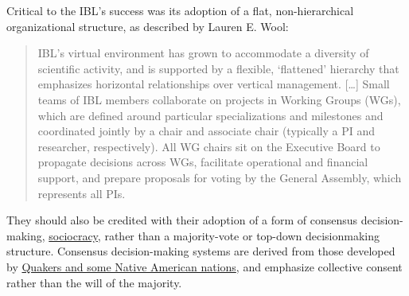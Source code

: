 Critical to the IBL's success was its adoption of a flat,
non-hierarchical organizational structure, as described by Lauren E.
Wool:

\begin{quote}
IBL's virtual environment has grown to accommodate a diversity of
scientific activity, and is supported by a flexible, `flattened'
hierarchy that emphasizes horizontal relationships over vertical
management. {[}\ldots{]} Small teams of IBL members collaborate on
projects in Working Groups (WGs), which are defined around particular
specializations and milestones and coordinated jointly by a chair and
associate chair (typically a PI and researcher, respectively). All WG
chairs sit on the Executive Board to propagate decisions across WGs,
facilitate operational and financial support, and prepare proposals for
voting by the General Assembly, which represents all PIs. \citep{woolKnowledgeNetworksHow2020} 
\end{quote}

They should also be credited with their adoption of a form of consensus
decision-making, \href{https://sociocracy.info}{sociocracy}, rather than
a majority-vote or top-down decisionmaking structure. Consensus
decision-making systems are derived from those developed by
\href{https://rhizomenetwork.wordpress.com/2011/06/18/a-brief-history-of-consenus-decision-making/}{Quakers
and some Native American nations}, and emphasize collective consent
rather than the will of the majority.

